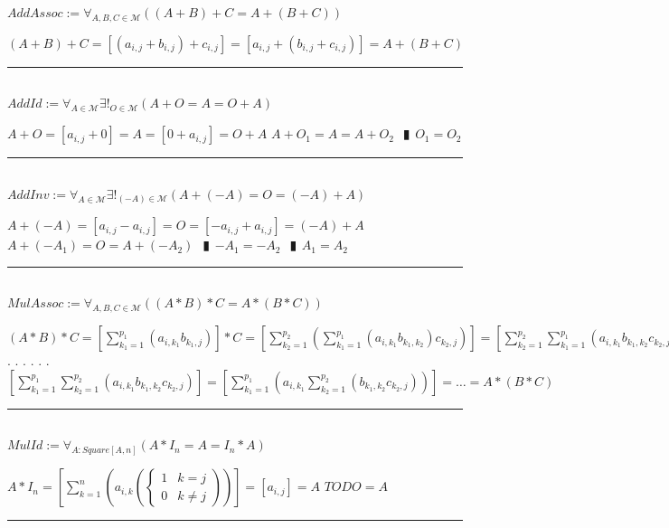 \documentclass{book}
\newcommand{\abr}{:=}
\newcommand{\cont}{\phantom{.}. . .\phantom{.}}
\newcommand{\pipe}{$\phantom{(}\vrectangleblack\phantom{)}$}
\newcommand{\pr}[1]{\left(#1\right)}
\begin{document}
$AddAssoc \abr \forall_{A, B, C \in \mathcal{M}}\pr{(A + B) + C = A + (B + C)}$
\begin{enumerate}
  \lit $(A + B) + C = [(a_{i, j} + b_{i, j}) + c_{i, j}] = [a_{i, j} + (b_{i, j} + c_{i, j})] = A + (B + C)$
\end{enumerate} \vspace{.75mm} \hrule \vspace{.75mm} \ \\

$AddId \abr \forall_{A \in \mathcal{M}} \exists!_{O \in \mathcal{M}}(A + O = A = O + A)$
\begin{enumerate}
  \lit $A + O = [a_{i, j} + 0] = A = [0 + a_{i, j}] = O + A$
  \lit $A + O_1 = A = A + O_2$ \pipe $O_1 = O_2$
\end{enumerate} \vspace{.75mm} \hrule \vspace{.75mm} \ \\

$AddInv \abr \forall_{A \in \mathcal{M}} \exists!_{(-A) \in \mathcal{M}}\pr{A + (-A) = O = (-A) + A}$
\begin{enumerate}
  \lit $A + (-A) = [a_{i, j} - a_{i, j}] = O = [-a_{i, j} + a_{i, j}] = (-A) + A$
  \lit $A + (-A_1) = O = A + (-A_2)$ \pipe $-A_1 = -A_2$ \pipe $A_1 = A_2$
\end{enumerate} \vspace{.75mm} \hrule \vspace{.75mm} \ \\ 

$MulAssoc \abr \forall_{A, B, C \in \mathcal{M}}\pr{(A * B) * C = A * (B * C)}$
\begin{enumerate}
  \lit $(A * B) * C = \left[\sum_{k_1 = 1}^{p_1}(a_{i, k_1} b_{k_1, j})\right] * C = \left[\sum_{k_2 = 1}^{p_2}\pr{\sum_{k_1 = 1}^{p_1}(a_{i, k_1} b_{k_1, k_2}) c_{k_2, j}}\right] = \left[\sum_{k_2 = 1}^{p_2} \sum_{k_1 = 1}^{p_1}(a_{i, k_1} b_{k_1, k_2} c_{k_2, j})\right] = $ \cont
  \lit \cont $\left[\sum_{k_1 = 1}^{p_1} \sum_{k_2 = 1}^{p_2}(a_{i, k_1} b_{k_1, k_2} c_{k_2, j})\right] = \left[\sum_{k_1 = 1}^{p_1}\pr{a_{i, k_1} \sum_{k_2 = 1}^{p_2}(b_{k_1, k_2} c_{k_2, j})}\right] = \ldots = A * (B * C)$
\end{enumerate} \vspace{.75mm} \hrule \vspace{.75mm} \ \\ 

$MulId \abr \forall_{A : Square[A, n]}(A * I_n = A = I_n * A)$
\begin{enumerate}
  \lit $A * I_n = \left[\sum_{k = 1}^{n}\left(a_{i, k} 
    \left(\begin{cases} 
      1 & k = j \\
      0 & k \neq j 
    \end{cases}\right)
  \right)\right] = [a_{i, j}] = A$
  \lit $TODO = A$
\end{enumerate} \vspace{.75mm} \hrule \vspace{.75mm} \ \\ 
\end{document}
